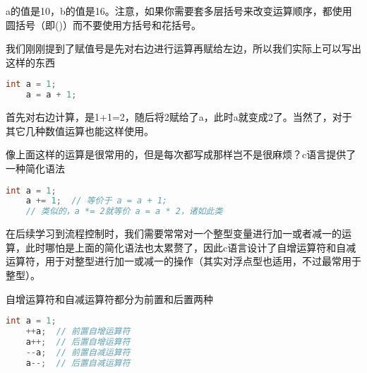 a的值是10，b的值是16。注意，如果你需要套多层括号来改变运算顺序，都使用圆括号（即()）而不要使用方括号和花括号。

我们刚刚提到了赋值号是先对右边进行运算再赋给左边，所以我们实际上可以写出这样的东西

\begin{lstlisting}[language=C]
    int a = 1;
    a = a + 1;
\end{lstlisting}

首先对右边计算，是1+1=2，随后将2赋给了a，此时a就变成2了。当然了，对于其它几种数值运算也能这样使用。

像上面这样的运算是很常用的，但是每次都写成那样岂不是很麻烦？c语言提供了一种简化语法

\begin{lstlisting}[language=C]
    int a = 1;
    a += 1;  // 等价于 a = a + 1;
    // 类似的，a *= 2就等价 a = a * 2，诸如此类
\end{lstlisting}

在后续学习到流程控制时，我们需要常常对一个整型变量进行加一或者减一的运算，此时哪怕是上面的简化语法也太累赘了，因此c语言设计了自增运算符和自减运算符，用于对整型进行加一或减一的操作（其实对浮点型也适用，不过最常用于整型）。

自增运算符和自减运算符都分为前置和后置两种

\begin{lstlisting}[language=C]
    int a = 1;
    ++a;  // 前置自增运算符
    a++;  // 后置自增运算符
    --a;  // 前置自减运算符
    a--;  // 后置自减运算符
\end{lstlisting}


